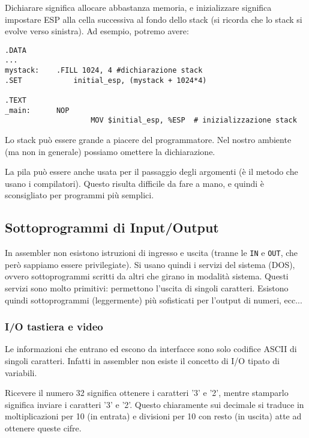 \documentclass[a4paper,11pt]{article}
\begin{document}
Dichiarare significa allocare abbastanza memoria, e inizializzare significa impostare ESP alla cella successiva al fondo dello stack (si ricorda che lo stack si evolve verso sinistra). Ad esempio, potremo avere:

\begin{lstlisting}	
.DATA
...
mystack:	.FILL 1024, 4 #dichiarazione stack
.SET			initial_esp, (mystack + 1024*4)

.TEXT
_main:		NOP
					MOV $initial_esp, %ESP	# inizializzazione stack
\end{lstlisting}

Lo stack può essere grande a piacere del programmatore.
Nel nostro ambiente (ma non in generale) possiamo omettere la dichiarazione.

La pila può essere anche usata per il passaggio degli argomenti (è il metodo che usano i compilatori). 
Questo risulta difficile da fare a mano, e quindi è sconsigliato per programmi più semplici.

\subsection{Sottoprogrammi di Input/Output}
In assembler non esistono istruzioni di ingresso e uscita (tranne le \lstinline|IN| e \lstinline|OUT|, che però sappiamo essere privilegiate).
Si usano quindi i servizi del sistema (DOS), ovvero sottoprogrammi scritti da altri che girano in modalità sistema.
Questi servizi sono molto primitivi: permettono l'uscita di singoli caratteri.
Esistono quindi sottoprogrammi (leggermente) più sofisticati per l'output di numeri, ecc...

\subsubsection{I/O tastiera e video}
Le informazioni che entrano ed escono da interfacce sono solo codifice ASCII di singoli caratteri.
Infatti in assembler non esiste il concetto di I/O tipato di variabili.

Ricevere il numero 32 significa ottenere i caratteri '3' e '2', mentre stamparlo significa inviare i caratteri '3' e '2'.
Questo chiaramente sui decimale si traduce in moltiplicazioni per 10 (in entrata) e divisioni per 10 con resto (in uscita) atte ad ottenere queste cifre.
\end{document}
